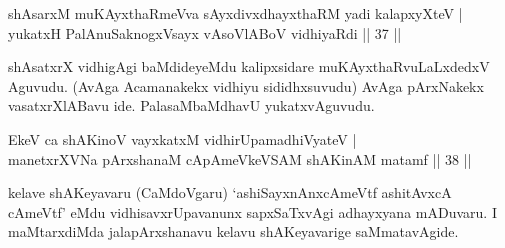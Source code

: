 \begin{shl}
shAsarxM muKAyxthaRmeVva sAyxdivxdhayxthaRM yadi kalapxyXteV | \\
yukatxH PalAnuSaknogxV\s sayx vAsoVlABoV vidhiyaRdi \hfill|| 37 || 
\end{shl}

\begin{artha}
shAsatxrX vidhigAgi baMdideyeMdu kalipxsidare muKAyxthaRvuLaLxdedxV Aguvudu. (AvAga Acamanakekx vidhiyu sididhxsuvudu) AvAga pArxNakekx vasatxrXlABavu ide. PalasaMbaMdhavU yukatxvAguvudu.
\end{artha}

\begin{shl}
EkeV ca shAKinoV vayxkatxM vidhirUpamadhiVyateV | \\
manetxrXVNa pArxshanaM cApAmeVkeVSAM shAKinAM matamf \hfill|| 38 || 
\end{shl}

\begin{artha}
kelave shAKeyavaru (CaMdoVgaru) `ashiSayxnAnxcAmeVtf ashitAvxcA cAmeVtf' eMdu vidhisavxrUpavanunx sapxSaTxvAgi adhayxyana mADuvaru. I maMtarxdiMda jala\-pArxshanavu kelavu shAKeyavarige saMmatavAgide.
\end{artha}

